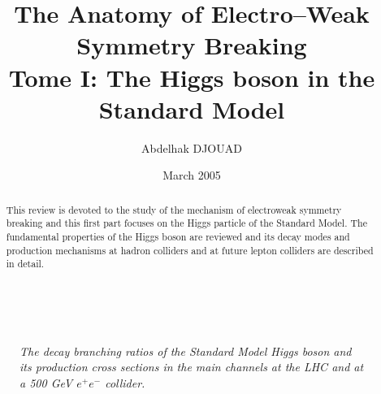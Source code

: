 \documentclass[12pt]{article}
\def\red{\color{Red}}
\def\blue{\color{Blue}}
\begin{document}
\newcommand{\lsim}{\raisebox{-0.13cm}{~\shortstack{$<$ \\[-0.07cm] $\sim$}}~}
\newcommand{\gsim}{\raisebox{-0.13cm}{~\shortstack{$>$ \\[-0.07cm] $\sim$}}~}
\newcommand{\dx}{\mbox{\rm d}}
\newcommand{\ra}{\rightarrow}
\newcommand{\lra}{\longrightarrow}
\newcommand{\ee}{e^+e^-}
\newcommand{\gam}{\gamma \gamma}
\newcommand{\tb}{\tan \beta}
\newcommand{\s}{\smallskip}
\newcommand{\nn}{\noindent}
\newcommand{\non}{\nonumber}
\newcommand{\beq}{\begin{eqnarray}}
\newcommand{\eeq}{\end{eqnarray}}
\newcommand{\pslash}{\not\hspace*{-1.6mm}p}
\newcommand{\kslash}{\not\hspace*{-1.6mm}k}
\newcommand{\lslash}{\not\hspace*{-1.6mm}l}
\newcommand{\eslash}{\hspace*{-1.4mm}\not\hspace*{-1.6mm}E}
\newcommand{\bb}{\blue{\large $\bullet$}}
\newcommand{\rb}{\red{\large $\bullet$}}
\newcommand{\bH}{\blue{$H$}}
\newcommand{\ib}{{\it ibid.\ }}
%
\thispagestyle{empty}


\title{The Anatomy of Electro--Weak Symmetry Breaking\\
Tome I: The Higgs boson in the Standard Model}

\author{Abdelhak DJOUAD}

\date{March 2005}
\maketitle

\begin{abstract} 

\nn This review is devoted to the study of the mechanism of electroweak 
symmetry breaking and this first part focuses on the Higgs particle of the
Standard Model. The fundamental properties of the Higgs boson are reviewed
and its decay modes and production mechanisms at hadron colliders and at 
future lepton colliders are described in detail. 
\end{abstract}

\begin{figure}[!h]
\begin{center}
\hspace*{-2.2cm}
\mbox{
\hspace*{-3.3cm}
\hspace*{-3.3cm}
} 
\end{center}
\vspace*{-5.8cm}
\begin{center}
\nn \small{\it 
The decay branching ratios of the Standard Model Higgs boson and its production 
cross sections in the main channels at the LHC and at a 500 GeV $\ee$ collider.}
\end{center}
\vspace*{-.6cm}
\end{figure}
\end{document}
